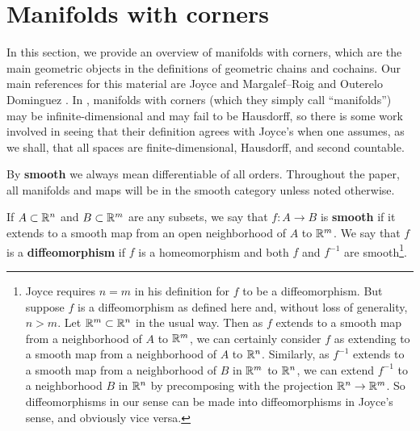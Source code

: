 
\section{Manifolds with corners}\label{S: manifolds with corners}

In this section, we provide an overview of manifolds with corners, which are the main geometric objects in the definitions of geometric chains and cochains.
Our main references for this material are Joyce \cite{Joy12} and Margalef--Roig and Outerelo Dominguez \cite{MaDo92}. In \cite{MaDo92}, manifolds with corners (which they simply call ``manifolds'') may be infinite-dimensional and may fail to be Hausdorff, so there is some work involved in seeing that their definition agrees with Joyce's when one assumes, as we shall, that all spaces are finite-dimensional, Hausdorff, and second countable.

By \textbf{smooth} we always mean differentiable of all orders.
Throughout the paper, all manifolds and maps will be in the smooth category unless noted otherwise.

\begin{definition}\label{D: smooth}
	If $A \subset \mathbb{R}^n$ and $B \subset \mathbb{R}^m$ are any subsets, we say that $f \colon A \to B$ is \textbf{smooth} if it extends to a smooth map from an open neighborhood of $A$ to $\mathbb{R}^m$.
	We say that $f$ is a \textbf{diffeomorphism} if $f$ is a homeomorphism and both $f$ and $f^{-1}$ are smooth\footnote{Joyce requires $n = m$ in his definition for $f$ to be a diffeomorphism.
	But suppose $f$ is a diffeomorphism as defined here and, without loss of generality, $n>m$.
	Let $\mathbb{R}^m \subset \mathbb{R}^n$ in the usual way.
	Then as $f$ extends to a smooth map from a neighborhood of $A$ to $\mathbb{R}^m$, we can certainly consider $f$ as extending to a smooth map from a neighborhood of $A$ to $\mathbb{R}^n$.
	Similarly, as $f^{-1}$ extends to a smooth map from a neighborhood of $B$ in $\mathbb{R}^m$ to $\mathbb{R}^n$, we can extend $f^{-1}$ to a neighborhood $B$ in $\mathbb{R}^n$ by precomposing with the projection $\mathbb{R}^n \to \mathbb{R}^m$.
	So diffeomorphisms in our sense can be made into diffeomorphisms in Joyce's sense, and obviously vice versa.}.
\end{definition}

